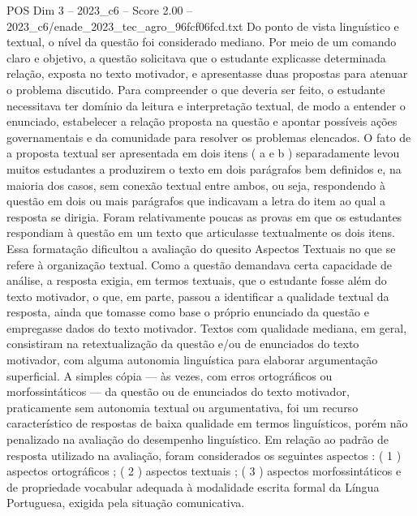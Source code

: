 \begin{textsample}{POS Dim 3 – 2023\_c6 – Score 2.00 – 2023\_c6/enade\_2023\_tec\_agro\_96fcf06fcd.txt}
Do ponto de vista linguístico e textual, o nível da questão foi considerado mediano.
Por meio de um comando claro e objetivo, a questão solicitava que o estudante explicasse determinada relação, exposta no texto motivador, e apresentasse duas propostas para atenuar o problema discutido.
Para compreender o que deveria ser feito, o estudante necessitava ter domínio da leitura e interpretação textual, de modo a entender o enunciado, estabelecer a relação proposta na questão e apontar possíveis ações governamentais e da comunidade para resolver os problemas elencados.
O fato de a proposta textual ser apresentada em dois itens ( a e b ) separadamente levou muitos estudantes a produzirem o texto em dois parágrafos bem definidos e, na maioria dos casos, sem conexão textual entre ambos, ou seja, respondendo à questão em dois ou mais parágrafos que indicavam a letra do item ao qual a resposta se dirigia.
Foram relativamente poucas as provas em que os estudantes respondiam à questão em um texto que articulasse textualmente os dois itens.
Essa formatação dificultou a avaliação do quesito Aspectos Textuais no que se refere à organização textual.
Como a questão demandava certa capacidade de análise, a resposta exigia, em termos textuais, que o estudante fosse além do texto motivador, o que, em parte, passou a identificar a qualidade textual da resposta, ainda que tomasse como base o próprio enunciado da questão e empregasse dados do texto motivador.
Textos com qualidade mediana, em geral, consistiram na retextualização da questão e/ou de enunciados do texto motivador, com alguma autonomia linguística para elaborar argumentação superficial.
A simples cópia — às vezes, com erros ortográficos ou morfossintáticos — da questão ou de enunciados do texto motivador, praticamente sem autonomia textual ou argumentativa, foi um recurso característico de respostas de baixa qualidade em termos linguísticos, porém não penalizado na avaliação do desempenho linguístico.
Em relação ao padrão de resposta utilizado na avaliação, foram considerados os seguintes aspectos : ( 1 ) aspectos ortográficos ; ( 2 ) aspectos textuais ; ( 3 ) aspectos morfossintáticos e de propriedade vocabular adequada à modalidade escrita formal da Língua Portuguesa, exigida pela situação comunicativa.

\end{textsample}
